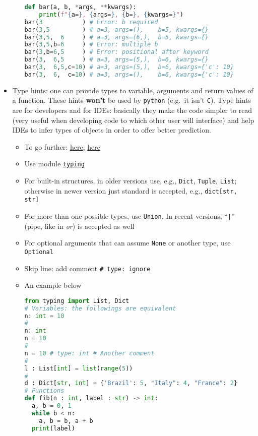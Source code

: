 \documentclass[a4paper,12pt,%
              final%
              ]{article}
\begin{document}
\begin{itemize}
\begin{itemize}
\begin{lstlisting}[language=python]
def bar(a, b, *args, **kwargs):
    print(f"{a=}, {args=}, {b=}, {kwargs=}")
bar(3           ) # Error: b required
bar(3,5         ) # a=3, args=(),    b=5, kwargs={}
bar(3,5,  6     ) # a=3, args=(6,),  b=5, kwargs={}
bar(3,5,b=6     ) # Error: multiple b
bar(3,b=6,5     ) # Error: positional after keyword
bar(3,  6,5     ) # a=3, args=(5,),  b=6, kwargs={}
bar(3,  6,5,c=10) # a=3, args=(5,),  b=6, kwargs={'c': 10}
bar(3,  6,  c=10) # a=3, args=(),    b=6, kwargs={'c': 10}
\end{lstlisting}
    \end{itemize}
  \item Type hints: one can provide types to variable, arguments and return values of a function. These hints \textbf{won't} be used by \texttt{python} (e.g.\ it isn't \texttt{C}). Type hints are for developers and for IDEs: basically they make the code simpler to read (very useful when developing code to which other user will interface) and help IDEs to infer types of objects in order to offer better prediction.
    \begin{itemize}
      \item To go further: \href{https://stackoverflow.com/a/32558710}{here}, \href{https://www.infoworld.com/article/3630372/get-started-with-python-type-hints.html}{here}
      \item Use module \href{https://docs.python.org/3/library/typing.html}{\texttt{typing}}
      \item For built-in structures, in older versions use, e.g., \texttt{Dict}, \texttt{Tuple}, \texttt{List}; otherwise in newer version just standard is accepted, e.g., \verb|dict[str, str]|
      \item For more than one possible types, use \verb|Union|. In recent versions, ``\verb!|!'' (pipe, like in \emph{or}) is accepted as well
      \item For optional arguments that can assume \verb|None| or another type, use \verb|Optional|
      \item Skip line: add comment \verb|# type: ignore|
      \item An example below
\begin{lstlisting}[language=python]
from typing import List, Dict
# Variables: the followings are equivalent
n: int = 10
#
n: int
n = 10
#
n = 10 # type: int # Another comment
#
l : List[int] = list(range(5))
#
d : Dict[str, int] = {'Brazil': 5, "Italy": 4, "France": 2}
# Functions
def fib(n : int, label : str) -> int:
  a, b = 0, 1
  while b < n:
    a, b = b, a + b
  print(label)

\end{lstlisting}
\end{itemize}
\end{itemize}
\end{document}
